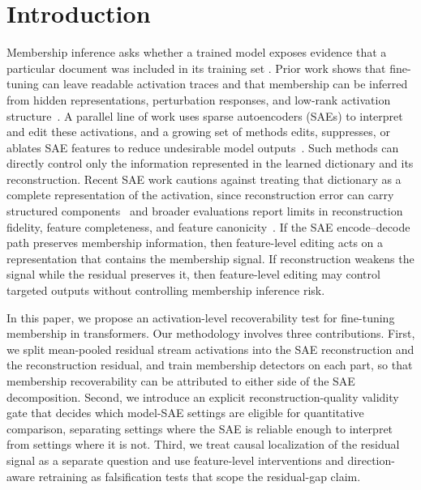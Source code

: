 \section{Introduction}
\label{sec:intro}

Membership inference asks whether a trained model exposes evidence that a particular document was included in its training set \cite{carlini2021extracting, carlini2023quantifying, shi2023detecting, zhang2025minkpp, wang2025recall}. Prior work shows that fine-tuning can leave readable activation traces and that membership can be inferred from hidden representations, perturbation responses, and low-rank activation structure~\citep{galli2024lumia,ferrando2026memtrace,minder2025narrow,huang2026gdrift,zhang2026gss}. A parallel line of work uses sparse autoencoders (SAEs) to interpret and edit these activations, and a growing set of methods edits, suppresses, or ablates SAE features to reduce undesirable model outputs~\citep{wang2025sspu,frikha2025privacyscalpel,suri2025mitigating,muhamed2025dsg}. Such methods can directly control only the information represented in the learned dictionary and its reconstruction. Recent SAE work cautions against treating that dictionary as a complete representation of the activation, since reconstruction error can carry structured components~\citep{engels2024dark} and broader evaluations report limits in reconstruction fidelity, feature completeness, and feature canonicity~\citep{karvonen2025saebench,leask2025sparse}. If the SAE encode--decode path preserves membership information, then feature-level editing acts on a representation that contains the membership signal. If reconstruction weakens the signal while the residual preserves it, then feature-level editing may control targeted outputs without controlling membership inference risk.

In this paper, we propose an activation-level recoverability test for fine-tuning membership in transformers. Our methodology involves three contributions. First, we split mean-pooled residual stream activations into the SAE reconstruction and the reconstruction residual, and train membership detectors on each part, so that membership recoverability can be attributed to either side of the SAE decomposition. Second, we introduce an explicit reconstruction-quality validity gate that decides which model-SAE settings are eligible for quantitative comparison, separating settings where the SAE is reliable enough to interpret from settings where it is not. Third, we treat causal localization of the residual signal as a separate question and use feature-level interventions and direction-aware retraining as falsification tests that scope the residual-gap claim.

